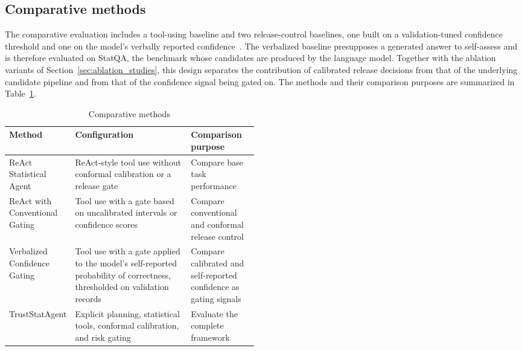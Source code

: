 \documentclass[preprint,12pt,authoryear]{elsarticle}
\begin{document}
\subsection{Comparative methods}
\label{sec:comparative_methods}

The comparative evaluation includes a tool-using baseline and two release-control baselines, one built on a validation-tuned confidence threshold and one on the model's verbally reported confidence~\citep{kadavath2022language}. The verbalized baseline presupposes a generated answer to self-assess and is therefore evaluated on StatQA, the benchmark whose candidates are produced by the language model. Together with the ablation variants of Section~\ref{sec:ablation_studies}, this design separates the contribution of calibrated release decisions from that of the underlying candidate pipeline and from that of the confidence signal being gated on. The methods and their comparison purposes are summarized in Table~\ref{tab:comparative_methods}.

\begin{table}[H]
    \centering
    \caption{Comparative methods}
    \label{tab:comparative_methods}
    \small
    \renewcommand{\arraystretch}{1.2}

    \begin{tabularx}{\linewidth}{
        @{}
        >{\raggedright\arraybackslash}p{0.21\linewidth}
        >{\raggedright\arraybackslash}X
        >{\raggedright\arraybackslash}p{0.27\linewidth}
        @{}
    }
        \toprule
        \textbf{Method}
        & \textbf{Configuration}
        & \textbf{Comparison purpose} \\
        \midrule

        ReAct Statistical Agent
        & ReAct-style tool use without conformal calibration
          or a release gate
        & Compare base task performance \\

        ReAct with Conventional Gating
        & Tool use with a gate based on uncalibrated intervals
          or confidence scores
        & Compare conventional and conformal release control \\

        Verbalized Confidence Gating
        & Tool use with a gate applied to the model's
          self-reported probability of correctness, thresholded on
          validation records
        & Compare calibrated and self-reported
          confidence as gating signals \\

        TrustStatAgent
        & Explicit planning, statistical tools, conformal
          calibration, and risk gating
        & Evaluate the complete framework \\

        \bottomrule
    \end{tabularx}
\end{table}
\end{document}

